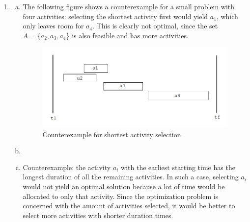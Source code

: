 \documentclass{article}
\begin{document}
\begin{enumerate}[1.]
\begin{lstlisting}
Greedy-Activity-Selector-2(s, f):
    n = s.length
    A = {$a_1$}
    k = 1
    for m = 2 to n:
        if f[m] $\leq$ s[k]:
            A = A $\cup$ {$a_m$}
            k = m
        end if
    end for
    return A
\end{lstlisting}

    \item 
    \begin{enumerate}[(a)]
        \item The following figure shows a counterexample for a small problem with four activities: selecting the shortest activity first would yield $a_1$, which only leaves room for $a_4$. This is clearly not optimal, since the set $A = \{a_2, a_3, a_4\}$ is also feasible and has more activities.
    	\begin{figure}[ht]
    		\centering
    		\includegraphics[width=1.0\linewidth]{Shortest.PNG}
    		\caption{Counterexample for shortest activity selection.}
    		\label{diagrams}
    	\end{figure}
        \item
        \item Counterexample: the activity $a_i$ with the earliest starting time has the longest duration of all the remaining activities. In such a case, selecting $a_i$ would not yield an optimal solution because a lot of time would be allocated to only that activity. Since the optimization problem is concerned with the amount of activities selected, it would be better to select more activities with shorter duration times.
    \end{enumerate}
    

\end{enumerate}
\end{document}
